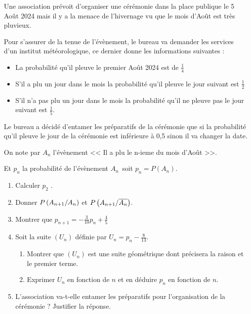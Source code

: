 \begin{exercice}
Une association prévoit d'organiser une cérémonie dans la place publique
le 5 Août 2024 mais il y a la menace de l'hivernage vu que le mois d'Août
est très pluvieux.

Pour s'assurer de la tenue de l'évènement, le bureau va demander les
services d'un institut météorologique, ce dernier donne les informations
suivantes :
\begin{itemize}
\item La probabilité qu'il pleuve le premier Août 2024 est de  $ \frac{1}{4} $
\item S'il a plu un jour dans le mois la probabilité qu'il pleuve le jour suivant est $ \frac{1}{2} $
\item S’il n'a pas plu un jour dans le mois la probabilité qu’il ne pleuve pas
le jour suivant est $ \frac{1}{5} $.
\end{itemize}
Le bureau a décidé d'entamer les préparatifs de la cérémonie que si la
probabilité qu'il pleuve le jour de la cérémonie est inférieure à 0,5 sinon il va
changer la date.

\noindent On note par $ A_n $ l'évènement << Il a plu le n-ieme du mois d'Août >>.

\noindent Et  $ p_n $ la probabilité de l'évènement \; $ A_n $\, soit   $p_n=P(A_n)$.
\begin{enumerate}
\item Calculer $ p_2 $ .
\item  Donner \; $ P \left(A_{n+1} /A_{n}\right) $\;  et \; $ P \left(A_{n+1} /\overline{A_{n}}\right) $.
\item Montrer que \; $ p_{n+1}=-\frac{3}{10}p_n +\frac{4}{5}$
\item Soit la suite $(U_  n)$ définie par  $U_n=p_n -\frac{8}{13}$.
\begin{enumerate}
\item Montrer que $(U_  n)$ est une suite géométrique dont précisera la raison et
le premier terme.
\item Exprimer $U_n$ en fonction de $n$ et en déduire $p_n$ en fonction de $n$.
\end{enumerate}
\item L’association va-t-elle entamer les préparatifs pour l’organisation de la
cérémonie ? Justifier la réponse.
\end{enumerate} 
\end{exercice} 

